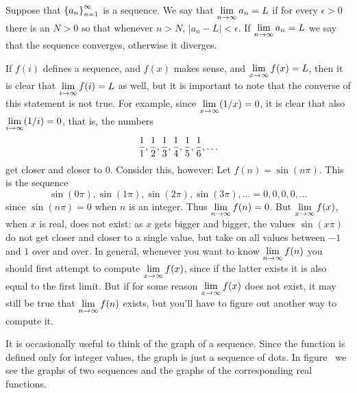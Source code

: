 \begin{definition} \relax{}
Suppose that $\displaystyle\left\{a_n\right\}_{n=1}^\infty$ is a sequence.
We say that $\displaystyle \lim_{n\to \infty}a_n=L$ if for every $\epsilon>0$
there is an $N > 0$ so that whenever $n>N$, $|a_n-L|<\epsilon$. If
$\displaystyle \lim_{n\to\infty}a_n=L$ we say that the sequence {\dfont
converges\/},
otherwise it {\dfont diverges\/}.  
\end{definition} 

If $f(i)$ defines a sequence, and $f(x)$ makes sense, and 
$\displaystyle \lim_{x\to\infty}f(x)=L$, then it is clear that
$\displaystyle \lim_{i\to\infty}f(i)=L$ as well, but it is important to note that
the converse of this statement is not true. For example, since
$\displaystyle \lim_{x\to\infty}(1/x)=0$, it is clear that also
$\displaystyle \lim_{i\to\infty}(1/i)=0$, that is, the numbers
$${1\over1},{1\over2},{1\over3},{1\over4},{1\over5},{1\over6},\ldots$$
get closer and closer to 0. Consider this, however: Let 
$f(n)=\sin(n\pi)$. This is the sequence
$$
  \sin(0\pi), \sin(1\pi),\sin(2\pi),\sin(3\pi),\ldots=0,0,0,0,\ldots
$$
since $\sin(n\pi)=0$ when $n$ is an integer. Thus
$\displaystyle \lim_{n\to\infty}f(n)=0$. But $\displaystyle \lim_{x\to\infty}f(x)$, when $x$ is
real, does not exist: as $x$ gets bigger and bigger, the values
$\sin(x\pi)$ do not get closer and closer to a single value, but take
on all values between $-1$ and $1$ over and over. In general, whenever
you want to know $\displaystyle \lim_{n\to\infty}f(n)$ you should first attempt to
compute $\displaystyle \lim_{x\to\infty}f(x)$, since if the latter exists it is also
equal to the first limit. But if for some reason
$\displaystyle \lim_{x\to\infty}f(x)$ does not exist, it may still be true that 
$\displaystyle \lim_{n\to\infty}f(n)$ exists, but you'll have to figure out
another way to compute it.

It is occasionally useful to think of the graph of a sequence. Since
the function is defined only for integer values, the graph is just a
sequence of dots. In figure~ we see the
graphs of two sequences and the graphs of the corresponding real
functions.

